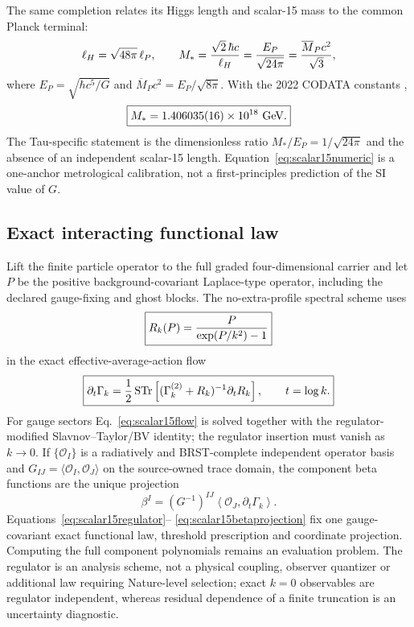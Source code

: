 \documentclass[11pt]{article}
\begin{document}
The same completion relates its Higgs length and scalar-15 mass to the common
Planck terminal:
\begin{equation}
 \ell_H=\sqrt{48\pi}\,\ell_P,
 \qquad
 M_*={\sqrt2\,\hbar c\over\ell_H}
 ={E_P\over\sqrt{24\pi}}
 ={\overline M_Pc^2\over\sqrt3},
 \label{eq:scalar15scale}
\end{equation}
where \(E_P=\sqrt{\hbar c^5/G}\) and
\(\overline M_Pc^2=E_P/\sqrt{8\pi}\).  With the 2022 CODATA constants
\citep{CODATA2022},
\begin{equation}
 \boxed{M_*=1.406035(16)\times10^{18}\ {\rm GeV}.}
 \label{eq:scalar15numeric}
\end{equation}
The Tau-specific statement is the dimensionless ratio
\(M_*/E_P=1/\sqrt{24\pi}\) and the absence of an independent scalar-15 length.
Equation~\eqref{eq:scalar15numeric} is a one-anchor metrological calibration,
not a first-principles prediction of the SI value of \(G\).

\subsection{Exact interacting functional law}

Lift the finite particle operator to the full graded four-dimensional carrier
and let \(P\) be the positive background-covariant Laplace-type operator,
including the declared gauge-fixing and ghost blocks.  The no-extra-profile
spectral scheme uses
\begin{equation}
 \boxed{R_k(P)={P\over\exp(P/k^2)-1}}
 \label{eq:scalar15regulator}
\end{equation}
in the exact effective-average-action flow \citep{Wetterich1993}
\begin{equation}
 \boxed{
 \partial_t\Gamma_k={1\over2}\operatorname{STr}
 \left[(\Gamma_k^{(2)}+R_k)^{-1}\partial_tR_k\right],
 \qquad t=\log k .}
 \label{eq:scalar15flow}
\end{equation}
For gauge sectors Eq.~\eqref{eq:scalar15flow} is solved together with the
regulator-modified Slavnov--Taylor/BV identity; the regulator insertion must
vanish as \(k\to0\).  If \(\{\mathcal O_I\}\) is a radiatively and
BRST-complete independent operator basis and
\(G_{IJ}=\langle\mathcal O_I,\mathcal O_J\rangle\) on the source-owned trace
domain, the component beta functions are the unique projection
\begin{equation}
 \boxed{
 \beta^I=(G^{-1})^{IJ}
 \left\langle\mathcal O_J,\partial_t\Gamma_k\right\rangle .}
 \label{eq:scalar15betaprojection}
\end{equation}
Equations~\eqref{eq:scalar15regulator}--
\eqref{eq:scalar15betaprojection} fix one gauge-covariant exact functional
law, threshold prescription and coordinate projection.  Computing the full
component polynomials remains an evaluation problem.  The regulator is an
analysis scheme, not a physical coupling, observer quantizer or additional
law requiring Nature-level selection; exact \(k=0\) observables are regulator
independent, whereas residual dependence of a finite truncation is an
uncertainty diagnostic.
\end{document}

